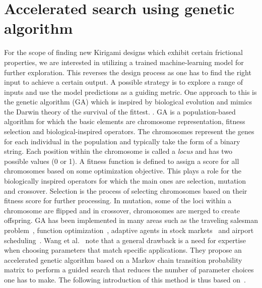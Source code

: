 

\section{Accelerated search using genetic algorithm}\label{sec:GA}
For the scope of finding new Kirigami designs which exhibit certain frictional properties, we are interested in utilizing a trained machine-learning model for further exploration. This reverses the design process as one has to find the right input to achieve a certain output. A possible strategy is to explore a range of inputs and use the model predictions as a guiding metric. One approach to this is the genetic algorithm (\acrshort{GA}) which is inspired by biological evolution and mimics the Darwin theory of the survival of the fittest. \cite{katoch_review_2021}. \acrshort{GA} is a population-based algorithm for
which the basic elements are chromosome representation, fitness selection and
biological-inspired operators. The chromosomes represent the genes for each
individual in the population and typically take the form of a binary string.
Each position within the chromosome is called a \textit{locus} and has two
possible values (0 or 1). A fitness function is defined to assign a score for
all chromosomes based on some optimization objective. This plays a role for the
biologically inspired operators for which the main ones are selection, mutation
and crossover. Selection is the process of selecting chromosomes based on their
fitness score for further processing. In mutation, some of the loci within a
chromosome are flipped and in crossover, chromosomes are merged to create
offspring. \acrshort{GA} has been implemented in many areas such as the traveling salesman problem~\cite{jiang2000distributed}, function optimization~\cite{szeto1998effects}, adaptive agents in stock markets~\cite{szeto2000adaptive} and airport scheduling~\cite{shiu2008self}. Wang et al.~\cite{Wang2010} note that a general drawback is a need for expertise when choosing parameters that match specific applications. They propose an accelerated genetic algorithm based on a Markov chain transition probability matrix to perform a guided search that reduces the number of parameter choices one has to make. The following introduction of this method is thus based on~\cite{Wang2010}.

